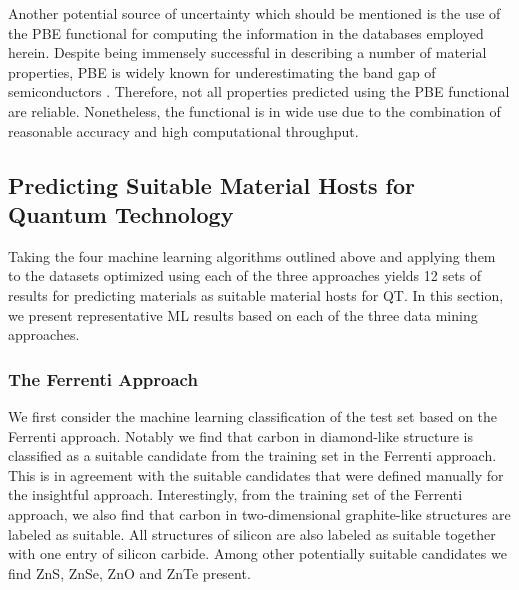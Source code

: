 \documentclass[superscriptaddress,unsortedaddress,
 amsmath,amssymb,
 aps,
]{revtex4-2}
\begin{document}
Another potential source of uncertainty which should be mentioned is the use of the PBE functional for computing the information in the databases employed herein. Despite being immensely successful in describing a number of material properties, PBE is widely known for underestimating the band gap of semiconductors \cite{Freysoldt2014}. Therefore, not all properties predicted using the PBE functional are reliable. Nonetheless, the functional is in wide use due to the combination of reasonable accuracy and high computational throughput. 

\subsection*{Predicting Suitable Material Hosts for Quantum Technology}

Taking the four machine learning algorithms outlined above and applying them to the datasets optimized using each of the three approaches yields 12 sets of results for predicting  materials as suitable material hosts for QT. In this section, we present representative ML results based on each of the three data mining approaches. 

\subsubsection*{The Ferrenti Approach}
We first consider the machine learning classification of the test set based on the Ferrenti approach. 
Notably we find that carbon in diamond-like structure is classified as a suitable candidate from the training set in the Ferrenti approach. 
This is in agreement with the suitable candidates that were defined manually for the insightful approach. 
Interestingly, from the training set of the Ferrenti approach, we also find that carbon in two-dimensional graphite-like structures are labeled as suitable. 
All structures of silicon are also labeled as suitable together with one entry of silicon carbide. 
Among other potentially suitable candidates we find ZnS, ZnSe, ZnO and ZnTe present. 

%
% 
%
\end{document}
